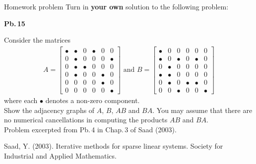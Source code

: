 \documentclass[t,usepdftitle=false]{beamer}
\begin{document}
\begin{frame}{Homework problem}\vspace{.1cm}
Turn in \textbf{your own} solution to the following problem:\vspace{.15cm}\\
\begin{minipage}[t]{0.1\textwidth}
\textbf{Pb.$\,$15}
\end{minipage}
\begin{minipage}[t]{0.89\textwidth}
Consider the matrices
\begin{align*}
A=
\begin{bmatrix}
\bullet&\bullet&0      &\bullet&0      &0      \\
0      &\bullet&0      &0      &0      &\bullet\\
0      &\bullet&\bullet&0      &0      &0      \\
0      &\bullet&0      &0      &\bullet&0      \\
0      &0      &0      &0      &\bullet&0      \\
0      &0      &0      &0      &0      &\bullet
\end{bmatrix}
\text{ and }
B=
\begin{bmatrix}
\bullet&0      &0      &0      &0      &0      \\
\bullet&0      &\bullet&0      &\bullet&0      \\
0      &\bullet&0      &0      &0      &0      \\
\bullet&\bullet&0      &0      &0      &0      \\
0      &\bullet&0      &\bullet&\bullet&0      \\
0      &0      &\bullet&0      &0      &\bullet
\end{bmatrix}
\end{align*}
where each $\bullet$ denotes a non-zero component.\vspace{.1cm}\\
Show the adjacency graphs of $A$, $B$, $AB$ and $BA$.
You may assume that there are no numerical cancellations in computing the products $AB$ and $BA$.\vspace{.05cm}\\
Problem excerpted from Pb.$\,$4 in Chap.$\,$3 of Saad (2003).
\end{minipage}\vspace{.15cm}
\tiny{Saad, Y. (2003). Iterative methods for sparse linear systems. Society for Industrial and Applied Mathematics.}
\end{frame}
\end{document}
